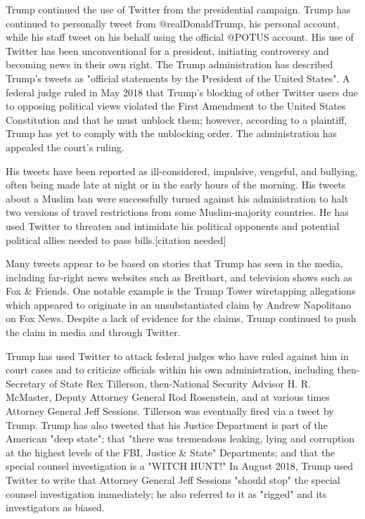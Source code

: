 Trump continued the use of Twitter from the presidential campaign. Trump
has continued to personally tweet from @realDonaldTrump, his personal
account, while his staff tweet on his behalf using the official @POTUS
account. His use of Twitter has been unconventional for a president,
initiating controversy and becoming news in their own right. The Trump
administration has described Trump's tweets as "official statements by
the President of the United States". A federal judge ruled in May 2018
that Trump's blocking of other Twitter users due to opposing political
views violated the First Amendment to the United States Constitution and
that he must unblock them; however, according to a plaintiff, Trump has
yet to comply with the unblocking order. The administration has appealed
the court's ruling.

His tweets have been reported as ill-considered, impulsive, vengeful,
and bullying, often being made late at night or in the early hours of
the morning. His tweets about a Muslim ban were successfully turned
against his administration to halt two versions of travel restrictions
from some Muslim-majority countries. He has used Twitter to threaten and
intimidate his political opponents and potential political allies needed
to pass bills.{[}citation needed{]}

Many tweets appear to be based on stories that Trump has seen in the
media, including far-right news websites such as Breitbart, and
television shows such as Fox \& Friends. One notable example is the
Trump Tower wiretapping allegations which appeared to originate in an
unsubstantiated claim by Andrew Napolitano on Fox News. Despite a lack
of evidence for the claims, Trump continued to push the claim in media
and through Twitter.

Trump has used Twitter to attack federal judges who have ruled against
him in court cases and to criticize officials within his own
administration, including then-Secretary of State Rex Tillerson,
then-National Security Advisor H. R. McMaster, Deputy Attorney General
Rod Rosenstein, and at various times Attorney General Jeff Sessions.
Tillerson was eventually fired via a tweet by Trump. Trump has also
tweeted that his Justice Department is part of the American "deep
state"; that "there was tremendous leaking, lying and corruption at the
highest levels of the FBI, Justice \& State" Departments; and that the
special counsel investigation is a "WITCH HUNT!" In August 2018, Trump
used Twitter to write that Attorney General Jeff Sessions "should stop"
the special counsel investigation immediately; he also referred to it as
"rigged" and its investigators as biased.

